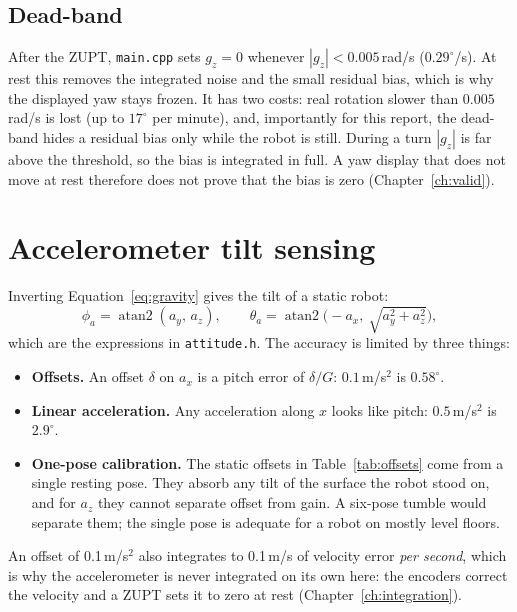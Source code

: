 \documentclass[11pt,a4paper]{report}
\newcommand{\code}[1]{\texttt{#1}}
\begin{document}
\subsection{Dead-band}
After the ZUPT, \code{main.cpp} sets $g_z=0$ whenever $|g_z|<0.005$\,rad/s ($0.29^\circ$/s). At rest this removes the integrated noise and the small residual bias, which is why the displayed yaw stays frozen. It has two costs: real rotation slower than $0.005$\,rad/s is lost (up to $17^\circ$ per minute), and, importantly for this report, the dead-band hides a residual bias only while the robot is still. During a turn $|g_z|$ is far above the threshold, so the bias is integrated in full. A yaw display that does not move at rest therefore does not prove that the bias is zero (Chapter~\ref{ch:valid}).

\section{Accelerometer tilt sensing}\label{sec:accelcal}
Inverting Equation~\eqref{eq:gravity} gives the tilt of a static robot:
\begin{equation}
  \phi_a=\operatorname{atan2}(a_y,\,a_z),\qquad \theta_a=\operatorname{atan2}\bigl(-a_x,\ \sqrt{a_y^2+a_z^2}\bigr), \label{eq:tiltacc}
\end{equation}
which are the expressions in \code{attitude.h}. The accuracy is limited by three things:
\begin{itemize}[noitemsep]
  \item \textbf{Offsets.} An offset $\delta$ on $a_x$ is a pitch error of $\delta/G$: $0.1$\,m/s$^2$ is $0.58^\circ$.
  \item \textbf{Linear acceleration.} Any acceleration along $x$ looks like pitch: $0.5$\,m/s$^2$ is $2.9^\circ$.
  \item \textbf{One-pose calibration.} The static offsets in Table~\ref{tab:offsets} come from a single resting pose. They absorb any tilt of the surface the robot stood on, and for $a_z$ they cannot separate offset from gain. A six-pose tumble would separate them; the single pose is adequate for a robot on mostly level floors.
\end{itemize}
An offset of 0.1\,m/s$^2$ also integrates to 0.1\,m/s of velocity error \emph{per second}, which is why the accelerometer is never integrated on its own here: the encoders correct the velocity and a ZUPT sets it to zero at rest (Chapter~\ref{ch:integration}).
\end{document}
